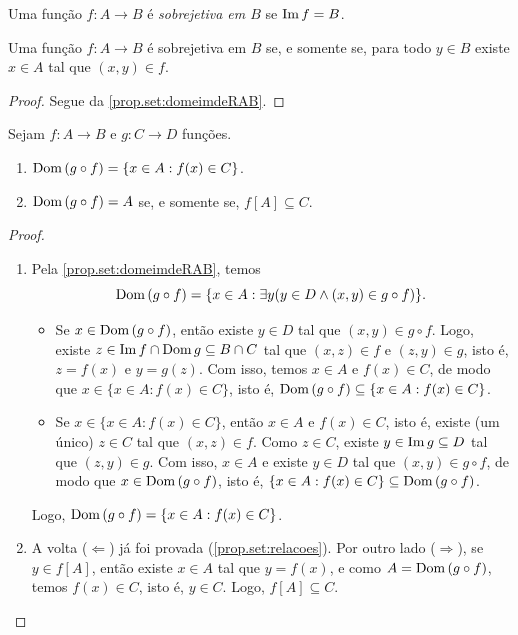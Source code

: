 \begin{definition}
    Uma função $f : A \to B$ é \emph{sobrejetiva em $B$} se $\operatorname{Im} f = B$.
\end{definition}

\begin{proposition}
    Uma função $f: A \to B$ é sobrejetiva em $B$ se, e somente se, para todo $y \in B$ existe $x \in A$ tal que $(x,y) \in f$.
\end{proposition}

\begin{proof}
    Segue da \cref{prop.set:domeimdeRAB}. \blackproof    
\end{proof}

\begin{lemma} \label{lem.set:fegsob}
    Sejam $f: A \to B$ e $g: C \to D$ funções.
        \begin{enumerate}[leftmargin=*, align=left, label=\textbf{(\alph*)}]
            \item $\operatorname{Dom} \, (g \circ f) = \{ x \in A : f(x) \in C\}$.
            \item $\operatorname{Dom} \, (g \circ f) = A$ se, e somente se, $f[A] \subseteq C$.
        \end{enumerate}
\end{lemma}

\begin{proof}
    \leavevmode
        \begin{enumerate}[leftmargin=*, align=left, label=\textbf{(\alph*)}]
            \item Pela \cref{prop.set:domeimdeRAB}, temos
                \[
                    \operatorname{Dom} \, (g \circ f) = \{ x \in A : \exists y(y \in D \land (x,y) \in g \circ f)\}.
                \]
                \begin{itemize}
                    \item[($\subseteq$)] Se $x \in \operatorname{Dom} \, (g \circ f)$, então existe $y \in D$ tal que $(x,y) \in g \circ f$. Logo, existe $z \in \operatorname{Im} f \cap \operatorname{Dom} g \subseteq B \cap C$ tal que $(x,z) \in f$ e $(z,y) \in g$, isto é, $z = f(x)$ e $y = g(z)$. Com isso, temos $x \in A$ e $f(x) \in C$, de modo que $x \in \{ x \in A : f(x) \in C\}$, isto é, $\operatorname{Dom} \, (g \circ f) \subseteq \{ x \in A : f(x) \in C\}$.
                    \item[($\supseteq$)] Se $x \in \{ x \in A : f(x) \in C\}$, então $x \in A$ e $f(x) \in C$, isto é, existe (um único) $z \in C$ tal que $(x,z) \in f$. Como $z \in C$, existe $y \in \operatorname{Im} g \subseteq D$ tal que $(z,y) \in g$. Com isso, $x \in A$ e existe $y \in D$ tal que $(x,y) \in g \circ f$, de modo que $x \in \operatorname{Dom} \, (g \circ f)$, isto é, $\{ x \in A : f(x) \in C\} \subseteq \operatorname{Dom}{(g \circ f)}$.  
                \end{itemize}
            Logo, $\operatorname{Dom} \, (g \circ f) = \{ x \in A : f(x) \in C\}$. \blackproof
            \item A volta ($\Leftarrow$) já foi provada (\cref{prop.set:relacoes}). Por outro lado ($\Rightarrow$), se $y \in f[A]$, então existe $x \in A$ tal que $y = f(x)$, e como $A = \operatorname{Dom} \, (g \circ f)$, temos $f(x) \in C$, isto é, $y \in C$. Logo, $f[A] \subseteq C$. \blackproof
        \end{enumerate}
\end{proof}

